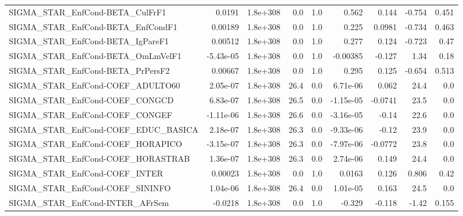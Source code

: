 \begin{tabular}{lrrrrrrrr}
SIGMA\_STAR\_EnfCond-BETA\_CulFrF1       &      0.0191 &     1.8e+308 &     0.0 &      1.0 &      0.562 &       0.144 &       -0.754 &         0.451 \\
SIGMA\_STAR\_EnfCond-BETA\_EnfCondF1     &     0.00189 &     1.8e+308 &     0.0 &      1.0 &      0.225 &      0.0981 &       -0.734 &         0.463 \\
SIGMA\_STAR\_EnfCond-BETA\_IgPareF1      &     0.00512 &     1.8e+308 &     0.0 &      1.0 &      0.277 &       0.124 &       -0.723 &          0.47 \\
SIGMA\_STAR\_EnfCond-BETA\_OmLmVelF1     &   -5.43e-05 &     1.8e+308 &     0.0 &      1.0 &   -0.00385 &      -0.127 &         1.34 &          0.18 \\
SIGMA\_STAR\_EnfCond-BETA\_PrPersF2      &     0.00667 &     1.8e+308 &     0.0 &      1.0 &      0.295 &       0.125 &       -0.654 &         0.513 \\
SIGMA\_STAR\_EnfCond-COEF\_ADULTO60      &    2.05e-07 &     1.8e+308 &    26.4 &      0.0 &   6.71e-06 &       0.062 &         24.4 &           0.0 \\
SIGMA\_STAR\_EnfCond-COEF\_CONGCD        &    6.83e-07 &     1.8e+308 &    26.5 &      0.0 &  -1.15e-05 &     -0.0741 &         23.5 &           0.0 \\
SIGMA\_STAR\_EnfCond-COEF\_CONGEF        &   -1.11e-06 &     1.8e+308 &    26.6 &      0.0 &  -3.16e-05 &       -0.14 &         22.6 &           0.0 \\
SIGMA\_STAR\_EnfCond-COEF\_EDUC\_BASICA   &    2.18e-07 &     1.8e+308 &    26.3 &      0.0 &  -9.33e-06 &       -0.12 &         23.9 &           0.0 \\
SIGMA\_STAR\_EnfCond-COEF\_HORAPICO      &   -3.15e-07 &     1.8e+308 &    26.3 &      0.0 &  -7.97e-06 &     -0.0772 &         23.8 &           0.0 \\
SIGMA\_STAR\_EnfCond-COEF\_HORASTRAB     &    1.36e-07 &     1.8e+308 &    26.3 &      0.0 &   2.74e-06 &       0.149 &         24.4 &           0.0 \\
SIGMA\_STAR\_EnfCond-COEF\_INTER         &     0.00023 &     1.8e+308 &     0.0 &      1.0 &     0.0163 &       0.126 &        0.806 &          0.42 \\
SIGMA\_STAR\_EnfCond-COEF\_SININFO       &    1.04e-06 &     1.8e+308 &    26.4 &      0.0 &   1.01e-05 &       0.163 &         24.5 &           0.0 \\
SIGMA\_STAR\_EnfCond-INTER\_AFrSem       &     -0.0218 &     1.8e+308 &     0.0 &      1.0 &     -0.329 &      -0.118 &        -1.42 &         0.155 \\

\end{tabular}
